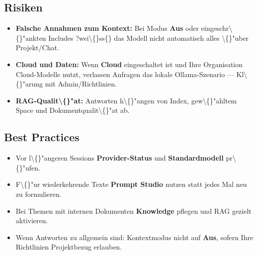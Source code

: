 \subsection{Risiken}

\begin{itemize}
\item \textbf{Falsche Annahmen zum Kontext:} Bei Modus \textbf{Aus} oder eingeschr\textbackslash\{\}"ankten Includes ?wei\textbackslash\{\}ss\{\}\texttt{} das Modell nicht automatisch alles \textbackslash\{\}"uber Projekt/Chat.
\item \textbf{Cloud und Daten:} Wenn \textbf{Cloud} eingeschaltet ist und Ihre Organisation Cloud-Modelle nutzt, verlassen Anfragen das lokale Ollama-Szenario --- Kl\textbackslash\{\}"arung mit Admin/Richtlinien.
\item \textbf{RAG-Qualit\textbackslash\{\}"at:} Antworten h\textbackslash\{\}"angen von Index, gew\textbackslash\{\}"ahltem Space und Dokumentqualit\textbackslash\{\}"at ab.
\end{itemize}

\subsection{Best Practices}

\begin{itemize}
\item Vor l\textbackslash\{\}"angeren Sessions \textbf{Provider-Status} und \textbf{Standardmodell} pr\textbackslash\{\}"ufen.
\item F\textbackslash\{\}"ur wiederkehrende Texte \textbf{Prompt Studio} nutzen statt jedes Mal neu zu formulieren.
\item Bei Themen mit internen Dokumenten \textbf{Knowledge} pflegen und RAG gezielt aktivieren.
\item Wenn Antworten zu allgemein sind: Kontextmodus nicht auf \textbf{Aus}, sofern Ihre Richtlinien Projektbezug erlauben.
\end{itemize}
